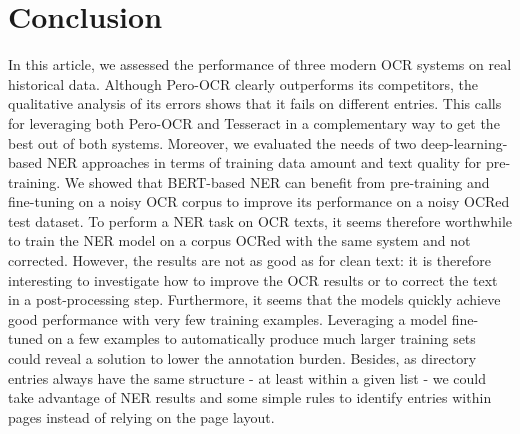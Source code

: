 \section{Conclusion}

In this article, we assessed the performance of three modern OCR systems on real historical data. Although Pero-OCR clearly outperforms its competitors, the qualitative analysis of its errors shows that it fails on different entries. This calls for leveraging both Pero-OCR and Tesseract in a complementary way to get the best out of both systems. Moreover, we evaluated the needs of two deep-learning-based NER approaches in terms of training data amount and text quality for pre-training. We showed that BERT-based NER can benefit from pre-training and fine-tuning on a noisy OCR corpus to improve its performance on a noisy OCRed test dataset. To perform a NER task on OCR texts, it seems therefore worthwhile to train the NER model on a corpus OCRed with the same system and not corrected. However, the results are not as good as for clean text: it is therefore interesting to investigate how to improve the OCR results or to correct the text in a post-processing step. Furthermore, it seems that the models quickly achieve good performance with very few training examples. Leveraging a model fine-tuned on a few examples to automatically produce much larger training sets could reveal a solution to lower the annotation burden. Besides, as directory entries always have the same structure - at least within a given list - we could take advantage of NER results and some simple rules to identify entries within pages instead of relying on the page layout.
